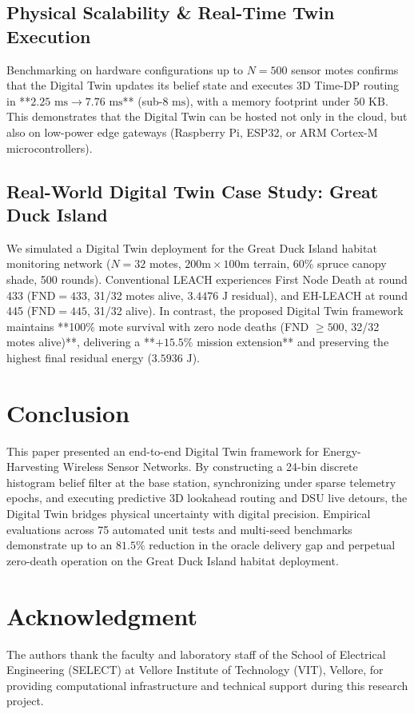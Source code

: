 \documentclass[journal]{IEEEtran}
\begin{document}
\subsection{Physical Scalability & Real-Time Twin Execution}
Benchmarking on hardware configurations up to $N = 500$ sensor motes confirms that the Digital Twin updates its belief state and executes 3D Time-DP routing in **$2.25\text{ ms} \to 7.76\text{ ms}$** (sub-$8\text{ ms}$), with a memory footprint under $50\text{ KB}$. This demonstrates that the Digital Twin can be hosted not only in the cloud, but also on low-power edge gateways (Raspberry Pi, ESP32, or ARM Cortex-M microcontrollers).

\subsection{Real-World Digital Twin Case Study: Great Duck Island}
We simulated a Digital Twin deployment for the Great Duck Island habitat monitoring network ($N=32$ motes, $200\text{m} \times 100\text{m}$ terrain, 60\% spruce canopy shade, 500 rounds). Conventional LEACH experiences First Node Death at round 433 ($\text{FND}=433$, 31/32 motes alive, $3.4476\text{ J}$ residual), and EH-LEACH at round 445 ($\text{FND}=445$, 31/32 alive). In contrast, the proposed Digital Twin framework maintains **100\% mote survival with zero node deaths (FND $\ge 500$, 32/32 motes alive)**, delivering a **$+15.5\%$ mission extension** and preserving the highest final residual energy ($3.5936\text{ J}$).

\section{Conclusion}
This paper presented an end-to-end Digital Twin framework for Energy-Harvesting Wireless Sensor Networks. By constructing a 24-bin discrete histogram belief filter at the base station, synchronizing under sparse telemetry epochs, and executing predictive 3D lookahead routing and DSU live detours, the Digital Twin bridges physical uncertainty with digital precision. Empirical evaluations across 75 automated unit tests and multi-seed benchmarks demonstrate up to an $81.5\%$ reduction in the oracle delivery gap and perpetual zero-death operation on the Great Duck Island habitat deployment.

\section*{Acknowledgment}
The authors thank the faculty and laboratory staff of the School of Electrical Engineering (SELECT) at Vellore Institute of Technology (VIT), Vellore, for providing computational infrastructure and technical support during this research project.
\end{document}
